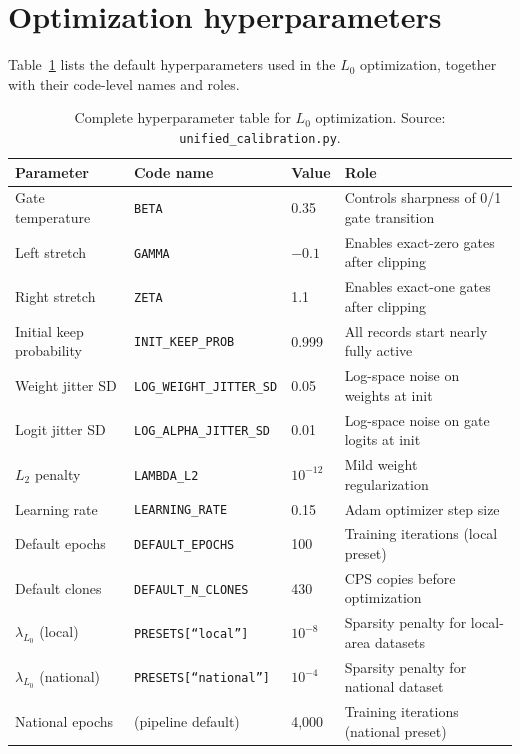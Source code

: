 \appendix

\section{Optimization hyperparameters}
\label{app:hyperparameters}

Table~\ref{tab:hyperparameters_full} lists the default hyperparameters used in the $L_0$
optimization, together with their code-level names and roles.

\begin{table}[ht]
\centering
{\tablefont
\begin{tabular}{llll}
\toprule
Parameter & Code name & Value & Role \\
\midrule
Gate temperature & \texttt{BETA} & 0.35 & Controls sharpness of 0/1 gate transition \\
Left stretch & \texttt{GAMMA} & $-0.1$ & Enables exact-zero gates after clipping \\
Right stretch & \texttt{ZETA} & 1.1 & Enables exact-one gates after clipping \\
Initial keep probability & \texttt{INIT\_KEEP\_PROB} & 0.999 & All records start nearly fully active \\
Weight jitter SD & \texttt{LOG\_WEIGHT\_JITTER\_SD} & 0.05 & Log-space noise on weights at init \\
Logit jitter SD & \texttt{LOG\_ALPHA\_JITTER\_SD} & 0.01 & Log-space noise on gate logits at init \\
$L_2$ penalty & \texttt{LAMBDA\_L2} & $10^{-12}$ & Mild weight regularization \\
Learning rate & \texttt{LEARNING\_RATE} & 0.15 & Adam optimizer step size \\
Default epochs & \texttt{DEFAULT\_EPOCHS} & 100 & Training iterations (local preset) \\
Default clones & \texttt{DEFAULT\_N\_CLONES} & 430 & CPS copies before optimization \\
$\lambda_{L_0}$ (local) & \texttt{PRESETS[``local'']} & $10^{-8}$ & Sparsity penalty for local-area datasets \\
$\lambda_{L_0}$ (national) & \texttt{PRESETS[``national'']} & $10^{-4}$ & Sparsity penalty for national dataset \\
National epochs & (pipeline default) & 4{,}000 & Training iterations (national preset) \\
\bottomrule
\end{tabular}
}
\caption{Complete hyperparameter table for $L_0$ optimization. Source: \texttt{unified\_calibration.py}.}
\label{tab:hyperparameters_full}
\end{table}

